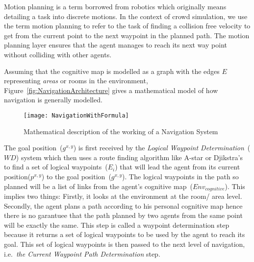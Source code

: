     Motion planning is a term borrowed from robotics which originally means detailing a task into discrete motions. In the context of crowd simulation, we use the term motion planning to refer to the task of finding a collision free velocity to get from the current point to the next waypoint in the planned path. The motion planning layer ensures that the agent manages to reach its next way point without colliding with other agents.

    Assuming that the cognitive map is modelled as a graph with the edges $E$ representing \emph{areas} or rooms in the environment, Figure~\ref{fig:NavigationArchitecture} gives a mathematical model of how navigation is generally modelled.



    \begin{figure}[!tb]
    \centering
    \texttt{[image: NavigationWithFormula]}
    \caption[Detailed Navigation Model]{Mathematical description of the working of a Navigation System}
    \label{fig:detailedNavigationModule}
    \end{figure}

    The goal position~($g^{x,y}$) is first received by the \emph{Logical Waypoint Determination}~($WD$) system which then uses a route finding algorithm like A-star or Djikstra's to find a set of logical waypoints~($E_i$) that will lead the agent from its current position($p^{x,y}$) to the goal position~($g^{x,y}$). The logical waypoints in the path so planned will be a list of links from the agent's cognitive map~($Env_{cognitive}$). This implies two things: Firstly, it looks at the environment at the room/ area level. Secondly, the agent plans a path according to his personal cognitive map hence there is no garantuee that the path planned by two agents from the same point will be exactly the same. This step is called a waypoint determination step because it returns a set of logical waypoints to be used by the agent to reach its goal. This set of logical waypoints is then passed to the next level of navigation, i.e.\ \emph{the Current Waypoint Path Determination} step.

